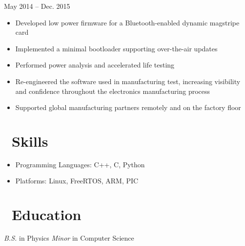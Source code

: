 \documentclass{resume}
\begin{document}
          {May 2014 -- Dec. 2015}
\begin{itemize}
  \item Developed low power firmware for a Bluetooth-enabled dynamic magstripe card
  \item Implemented a minimal bootloader supporting over-the-air updates
  \item Performed power analysis and accelerated life testing
  \item Re-engineered the software used in manufacturing test, increasing visibility
        and confidence throughout the electronics manufacturing process
  \item Supported global manufacturing partners remotely and on the factory floor
\end{itemize}
\vspace{3mm}

\section{\faCogs\ Skills}
\begin{itemize}[parsep=0.5ex]
  \item Programming Languages: C++, C, Python
  \item Platforms: Linux, FreeRTOS, ARM, PIC
\end{itemize}

\section{\faGraduationCap\ Education}
\textit{B.S.} in Physics
\newline
\textit{Minor} in Computer Science
\end{document}

